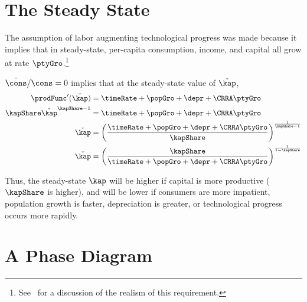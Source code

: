 \documentclass{handout}
\begin{document}
\section{The Steady State}

The assumption of labor augmenting technological progress was made 
because it implies that in steady-state, per-capita consumption, income,
and capital all grow at rate $\ptyGro$.\footnote{See~\cite{ghosDespiteUzawa} for a discussion of the realism of this requirement.}

$\dot{\cons}/\cons = 0$ implies that at the steady-state value of $\check{\kap}$,
\begin{equation}\begin{gathered}\begin{aligned}
  \prodFunc^{\prime}(\check{\kap}) & =  \timeRate +\popGro+\depr+\CRRA \ptyGro  \\
  \kapShare \check{\kap}^{\kapShare-1} & =  \timeRate +\popGro+\depr+\CRRA \ptyGro  \\
  \check{\kap} & =  \left(\frac{\timeRate +\popGro+\depr+\CRRA \ptyGro}{\kapShare}\right)^{\frac{1}{\kapShare-1}}
  \\      \check{\kap} & =  \left(\frac{\kapShare}{\timeRate +\popGro+\depr+\CRRA \ptyGro}\right)^{\frac{1}{1-\kapShare}}   
\end{aligned}\end{gathered}\end{equation}

Thus, the steady-state $\kap$ will be higher if capital 
is more productive ($\kapShare$ is higher), and will be lower if 
consumers are more impatient, population growth is faster, 
depreciation is greater, or technological progress occurs more rapidly.

\section{A Phase Diagram}
\end{document}
